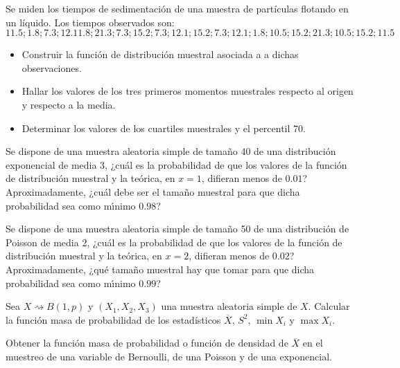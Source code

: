 \begin{ejercicio}
    Se miden los tiempos de sedimentación de una muestra de partículas flotando en un líquido. Los tiempos observados son: 
    \begin{equation*}
        11.5; 1.8; 7.3; 12.1 1.8; 21.3; 7.3; 15.2; 7.3; 12.1; 15.2; 7.3; 12.1; 1.8; 10.5; 15.2; 21.3; 10.5; 15.2; 11.5
    \end{equation*}
    \begin{itemize}
        \item Construir la función de distribución muestral asociada a a dichas observaciones.
        \item Hallar los valores de los tres primeros momentos muestrales respecto al origen y respecto a la media.
        \item Determinar los valores de los cuartiles muestrales y el percentil 70.
    \end{itemize}
\end{ejercicio}

\begin{ejercicio}
    Se dispone de una muestra aleatoria simple de tamaño 40 de una distribución exponencial de media 3, ¿cuál es la probabilidad de que los valores de la función de distribución muestral y la teórica, en $x=1$, difieran menos de $0.01$? Aproximadamente, ¿cuál debe ser el tamaño muestral para que dicha probabilidad sea como mı́nimo $0.98$?
\end{ejercicio}

\begin{ejercicio}
    Se dispone de una muestra aleatoria simple de tamaño 50 de una distribución de Poisson de media 2, ¿cuál es la probabilidad de que los valores de la función de distribución muestral y la teórica, en $x=2$, difieran menos de $0.02$? Aproximadamente, ¿qué tamaño muestral hay que tomar para que dicha probabilidad sea como mı́nimo $0.99$?
\end{ejercicio}

\begin{ejercicio}
   Sea $X\rightsquigarrow B(1,p)$ y $(X_1, X_2, X_3)$ una muestra aleatoria simple de $X$. Calcular la función masa de probabilidad de los estadísticos $\overline{X}$, $S^2$, $\min X_i$ y $\max X_i$.
\end{ejercicio}

\begin{ejercicio}
    Obtener la función masa de probabilidad o función de densidad de $\overline{X}$ en el muestreo de una variable de Bernoulli, de una Poisson y de una exponencial.
\end{ejercicio}

